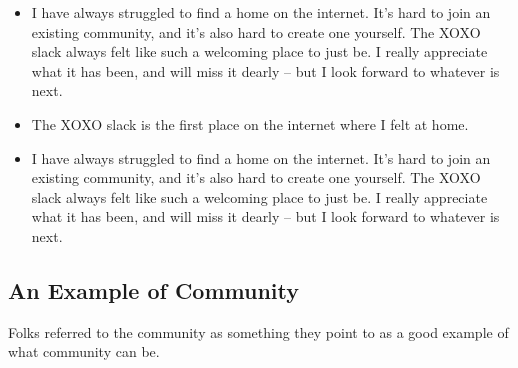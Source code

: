 \documentclass[
]{book}
\begin{document}
\begin{itemize}
\item
  I have always struggled to find a home on the internet. It's hard to join an existing community, and it's also hard to create one yourself. The XOXO slack always felt like such a welcoming place to just be. I really appreciate what it has been, and will miss it dearly -- but I look forward to whatever is next.
\item
  The XOXO slack is the first place on the internet where I felt at home.
\item
  I have always struggled to find a home on the internet. It's hard to join an existing community, and it's also hard to create one yourself. The XOXO slack always felt like such a welcoming place to just be. I really appreciate what it has been, and will miss it dearly -- but I look forward to whatever is next.
\end{itemize}

\subsection{An Example of Community}\label{an-example-of-community}

Folks referred to the community as something they point to as a good example of what community can be.
\end{document}
